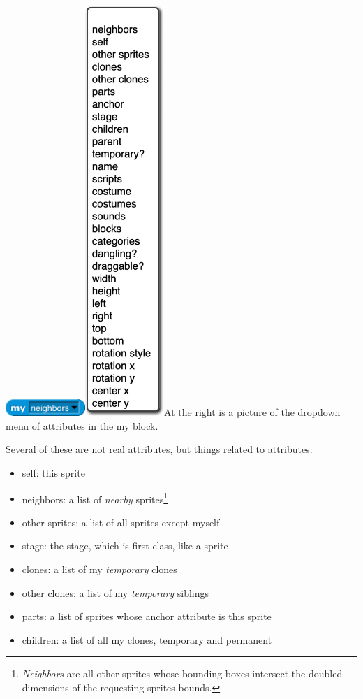 \includegraphics[width=1.19in,height=0.25in]{media/image781.png}\includegraphics[width=1.17569in,height=6.11667in]{media/image782.png}At
the right is a picture of the dropdown menu of attributes in the my
block.

Several of these are not real attributes, but things related to
attributes:

\begin{itemize}
\item
  self: this sprite
\item
  neighbors: a list of \emph{nearby} sprites\footnote{\emph{Neighbors}
    are all other sprites whose bounding boxes intersect the doubled
    dimensions of the requesting sprite\textquotesingle s bounds.}
\item
  other sprites: a list of all sprites except myself
\item
  stage: the stage, which is first-class, like a sprite
\item
  clones: a list of my \emph{temporary} clones
\item
  other clones: a list of my \emph{temporary} siblings
\item
  parts: a list of sprites whose anchor attribute is this sprite
\item
  children: a list of all my clones, temporary and permanent
\end{itemize}

